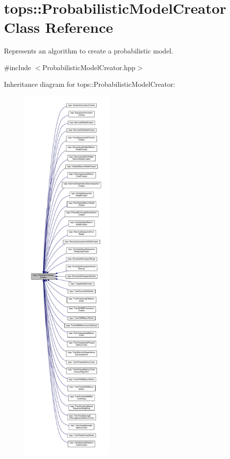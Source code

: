 \hypertarget{classtops_1_1ProbabilisticModelCreator}{}\section{tops\+:\+:Probabilistic\+Model\+Creator Class Reference}
\label{classtops_1_1ProbabilisticModelCreator}


Represents an algorithm to create a probabilistic model.  




{\ttfamily \#include $<$Probabilistic\+Model\+Creator.\+hpp$>$}



Inheritance diagram for tops\+:\+:Probabilistic\+Model\+Creator\+:
\nopagebreak
\begin{figure}[H]
\begin{center}
\leavevmode
\includegraphics[height=550pt]{classtops_1_1ProbabilisticModelCreator__inherit__graph}
\end{center}
\end{figure}
